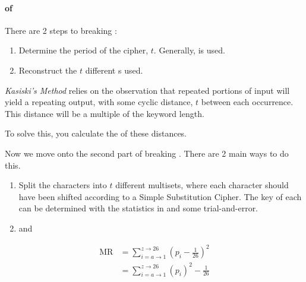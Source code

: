 \paragraph{ of }\label{par:Cryptanalysis_Vigenere_Cipher}
There are 2 steps to breaking :
\begin{enumerate}[noitemsep]
\item Determine the period of the cipher, $t$. Generally,  is used.
\item Reconstruct the $t$ different  s used.
\end{enumerate}

\begin{definition}\label{def:Kasiskis_Method}
  \emph{Kasiski's Method} relies on the observation that repeated portions of  input will yield a repeating  output, with some cyclic distance, $t$ between each occurrence.
  This distance will be a multiple of the keyword length.

  To solve this, you calculate the  of these distances.
\end{definition}

Now we move onto the second part of breaking .
There are 2 main ways to do this.
\begin{enumerate}[noitemsep]
\item Split the  characters into $t$ different multisets, where each character should have been shifted according to a Simple Substitution Cipher.
  The key of each  can be determined with the statistics in  and some trial-and-error.
\item {} and 
\end{enumerate}

\begin{definition}\label{def:Measure_of_Roughness}
  \begin{equation}\label{eq:Measure_of_Roughness}
    \begin{aligned}
      \mathrm{MR} &= \sum\limits_{i=a \to 1}^{z \to 26} {\left( p_{i} - \frac{1}{26} \right)}^{2} \\
      &= \sum\limits_{i=a \to 1}^{z \to 26} {\left( p_{i} \right)}^{2} - \frac{1}{26} \\
    \end{aligned}
  \end{equation}
\end{definition}

